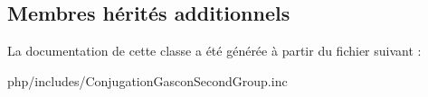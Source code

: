 \subsection*{Membres hérités additionnels}


La documentation de cette classe a été générée à partir du fichier suivant \+:\begin{DoxyCompactItemize}
\item 
php/includes/Conjugation\+Gascon\+Second\+Group.\+inc\end{DoxyCompactItemize}
